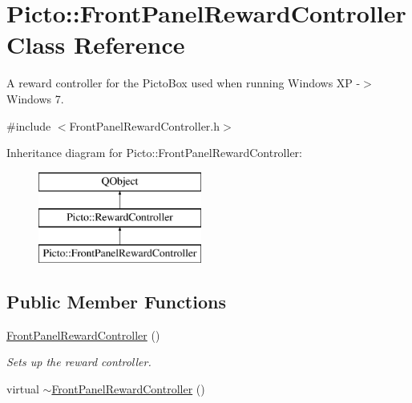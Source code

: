 \hypertarget{class_picto_1_1_front_panel_reward_controller}{\section{Picto\-:\-:Front\-Panel\-Reward\-Controller Class Reference}
\label{class_picto_1_1_front_panel_reward_controller}
}


A reward controller for the Picto\-Box used when running Windows X\-P -\/$>$ Windows 7.  




{\ttfamily \#include $<$Front\-Panel\-Reward\-Controller.\-h$>$}

Inheritance diagram for Picto\-:\-:Front\-Panel\-Reward\-Controller\-:\begin{figure}[H]
\begin{center}
\leavevmode
\includegraphics[height=3.000000cm]{class_picto_1_1_front_panel_reward_controller}
\end{center}
\end{figure}
\subsection*{Public Member Functions}
\begin{DoxyCompactItemize}
\item 
\hyperlink{class_picto_1_1_front_panel_reward_controller_a1513e93f9813613b861d38ef3f58e74b}{Front\-Panel\-Reward\-Controller} ()
\begin{DoxyCompactList}\small\item\em Sets up the reward controller. \end{DoxyCompactList}\item 
virtual \hyperlink{class_picto_1_1_front_panel_reward_controller_a0971824746bbf2e478fde6e03f835b8c}{$\sim$\-Front\-Panel\-Reward\-Controller} ()
\end{DoxyCompactItemize}
